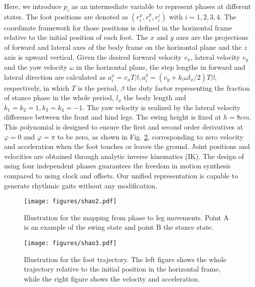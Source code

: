 \documentclass[letterpaper, 10 pt, journal, twoside]{IEEEtran} %
\begin{document}
Here, we introduce $p_i$ as an intermediate variable to represent phases at different states. The foot positions are denoted as $\left(r^x_i, r^y_i, r^z_i\right)$ with $i=1,2,3,4$. The coordinate framework for those positions is defined in the horizontal frame relative to the initial position of each foot. The $x$ and $y$ axes are the projections of forward and lateral axes of the body frame on the horizontal plane and the $z$ axis is upward vertical. Given the desired forward velocity $v_x$, lateral velocity $v_y$ and the yaw velocity $\omega$ in the horizontal plane, the step lengths in forward and lateral direction are calculated as $a_i^x=v_x T\beta, a_i^y=(v_y+k_i \omega l_x/2)T\beta$, respectively, in which $T$ is the period, $\beta$ the duty factor representing the fraction of stance phase in the whole period, $l_x$ the body length and $k_1=k_2=1, k_3=k_4=-1$. The yaw velocity is realized by the lateral velocity difference between the front and hind legs. The swing height is fixed at $h=8cm$. This polynomial is designed to ensure the first and second order derivatives at $\varphi=0$ and $\varphi=\pi$ to be zero, as shown in Fig. \ref{method_3}, corresponding to zero velocity and acceleration when the foot touches or leaves the ground. Joint positions and velocities are obtained through analytic inverse kinematics (IK). The design of using four independent phases guarantees the freedom in motion synthesis compared to using clock and offsets. Our unified representation is capable to generate rhythmic gaits without any modification.
\begin{figure}[!t]
	\centering
	\texttt{[image: figures/shao2.pdf]}
	\caption{Illustration for the mapping from phase to leg movements. Point A is an example of the swing state and point B the stance state.}
	\label{method_2}
\end{figure}
\begin{figure}[!t]
	\centering
	\texttt{[image: figures/shao3.pdf]}
	\caption{Illustration for the foot trajectory. The left figure shows the whole trajectory relative to the initial position in the horizontal frame, while the right figure shows the velocity and acceleration.}
	\label{method_3}
\end{figure}
\end{document}
